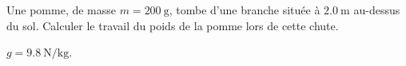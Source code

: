 Une pomme, de masse $m=\qty{200}{\g}$, tombe d'une branche située à
$\qty{2.0}{\m}$ au-dessus du sol. Calculer le travail du poids de la pomme lors
de cette chute.

\begin{donnees}
    $g=\qty{9.8}{\N\per\kg}$.
\end{donnees}

